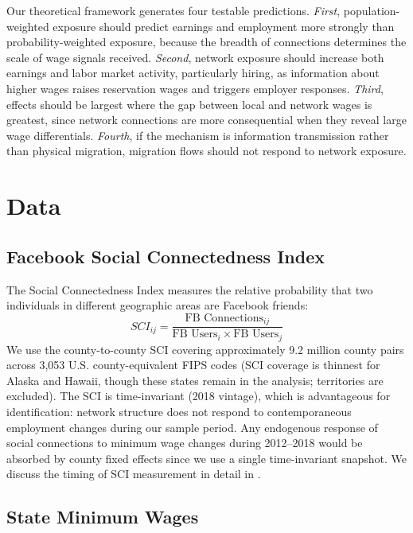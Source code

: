 \documentclass[12pt]{article}
\begin{document}
Our theoretical framework generates four testable predictions. \textit{First}, population-weighted exposure should predict earnings and employment more strongly than probability-weighted exposure, because the breadth of connections determines the scale of wage signals received. \textit{Second}, network exposure should increase both earnings and labor market activity, particularly hiring, as information about higher wages raises reservation wages and triggers employer responses. \textit{Third}, effects should be largest where the gap between local and network wages is greatest, since network connections are more consequential when they reveal large wage differentials. \textit{Fourth}, if the mechanism is information transmission rather than physical migration, migration flows should not respond to network exposure.


\section{Data}
\label{sec:data}

\subsection{Facebook Social Connectedness Index}

The Social Connectedness Index measures the relative probability that two individuals in different geographic areas are Facebook friends:
\begin{equation}
SCI_{ij} = \frac{\text{FB Connections}_{ij}}{\text{FB Users}_i \times \text{FB Users}_j}
\end{equation}
We use the county-to-county SCI covering approximately 9.2 million county pairs across 3,053 U.S. county-equivalent FIPS codes (SCI coverage is thinnest for Alaska and Hawaii, though these states remain in the analysis; territories are excluded). The SCI is time-invariant (2018 vintage), which is advantageous for identification: network structure does not respond to contemporaneous employment changes during our sample period. Any endogenous response of social connections to minimum wage changes during 2012--2018 would be absorbed by county fixed effects since we use a single time-invariant snapshot. We discuss the timing of SCI measurement in detail in .

\subsection{State Minimum Wages}
\end{document}
